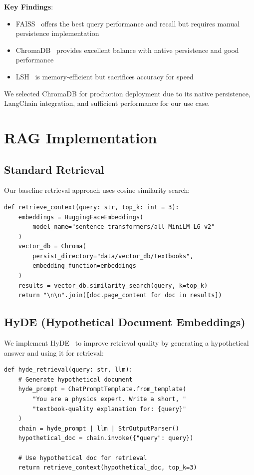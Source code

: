 \documentclass[11pt,a4paper]{article}
\begin{document}
\textbf{Key Findings}:
\begin{itemize}
    \item FAISS~\cite{johnson2019billion} offers the best query performance and recall but requires manual persistence implementation
    \item ChromaDB~\cite{chromadb2023} provides excellent balance with native persistence and good performance
    \item LSH~\cite{indyk1998approximate} is memory-efficient but sacrifices accuracy for speed
\end{itemize}

We selected ChromaDB for production deployment due to its native persistence, LangChain integration, and sufficient performance for our use case.

\section{RAG Implementation}

\subsection{Standard Retrieval}

Our baseline retrieval approach uses cosine similarity search:

\begin{lstlisting}[caption=Standard Retrieval Implementation]
def retrieve_context(query: str, top_k: int = 3):
    embeddings = HuggingFaceEmbeddings(
        model_name="sentence-transformers/all-MiniLM-L6-v2"
    )
    vector_db = Chroma(
        persist_directory="data/vector_db/textbooks",
        embedding_function=embeddings
    )
    results = vector_db.similarity_search(query, k=top_k)
    return "\n\n".join([doc.page_content for doc in results])
\end{lstlisting}

\subsection{HyDE (Hypothetical Document Embeddings)}

We implement HyDE~\cite{gao2022precise} to improve retrieval quality by generating a hypothetical answer and using it for retrieval:

\begin{lstlisting}[caption=HyDE Retrieval Implementation]
def hyde_retrieval(query: str, llm):
    # Generate hypothetical document
    hyde_prompt = ChatPromptTemplate.from_template(
        "You are a physics expert. Write a short, "
        "textbook-quality explanation for: {query}"
    )
    chain = hyde_prompt | llm | StrOutputParser()
    hypothetical_doc = chain.invoke({"query": query})
    
    # Use hypothetical doc for retrieval
    return retrieve_context(hypothetical_doc, top_k=3)
\end{lstlisting}
\end{document}
